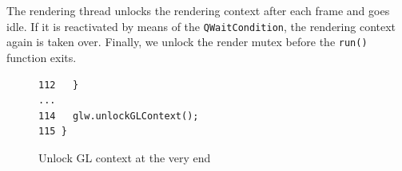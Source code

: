 \documentclass[jou,noapacite]{apa}
\begin{document}
%
The rendering thread unlocks the rendering context after each frame and goes
idle.
%
If it is reactivated by means of the \lstinline|QWaitCondition|, the rendering
context again is taken over.
%
Finally, we unlock the render mutex before the \lstinline|run()| function exits.
\begin{figure}[h]
\begin{lstlisting}[basicstyle=\scriptsize]
112   }
...
114   glw.unlockGLContext();
115 }
\end{lstlisting}
\caption{Unlock GL context at the very end}
\end{figure}
\end{document}
